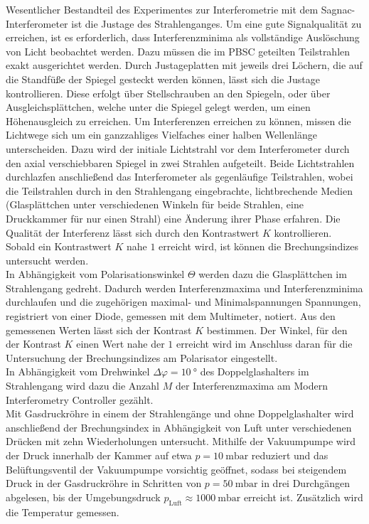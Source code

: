 \label{durchfuehrung}
\noindent Wesentlicher Bestandteil des Experimentes zur Interferometrie mit dem
Sagnac-Interferometer ist die Justage des Strahlenganges. Um eine gute
Signalqualität zu erreichen, ist es erforderlich, dass Interferenzminima als
vollständige Auslöschung von Licht beobachtet werden. Dazu müssen die im PBSC
geteilten Teilstrahlen exakt ausgerichtet werden. Durch Justageplatten mit
jeweils drei Löchern, die auf die Standfüße der Spiegel gesteckt werden können,
lässt sich die Justage kontrollieren. Diese erfolgt über Stellschrauben an den
Spiegeln, oder über Ausgleichsplättchen, welche unter die Spiegel gelegt werden,
um einen Höhenausgleich zu erreichen. Um Interferenzen erreichen zu können,
missen die Lichtwege sich um ein ganzzahliges Vielfaches einer halben Wellenlänge
unterscheiden. Dazu wird der initiale Lichtstrahl vor dem Interferometer durch
den axial verschiebbaren Spiegel in zwei Strahlen aufgeteilt. Beide Lichtstrahlen
durchlazfen anschließend das Interferometer als gegenläufige Teilstrahlen, wobei
die Teilstrahlen durch in den Strahlengang eingebrachte, lichtbrechende Medien
(Glasplättchen unter verschiedenen Winkeln für beide Strahlen, eine Druckkammer
für nur einen Strahl) eine Änderung ihrer Phase erfahren. Die Qualität der
Interferenz lässt sich durch den Kontrastwert $K$ kontrollieren. Sobald ein
Kontrastwert $K$ nahe $1$ erreicht wird, ist können die Brechungsindizes
untersucht werden. \\
\noindent In Abhängigkeit vom Polarisationswinkel $\Theta$ werden dazu die
Glasplättchen im Strahlengang gedreht. Dadurch werden Interferenzmaxima und
Interferenzminima durchlaufen und die zugehörigen maximal- und Minimalspannungen
Spannungen, registriert von einer Diode, gemessen mit dem Multimeter, notiert.
Aus den gemessenen Werten lässt sich der Kontrast $K$ bestimmen. Der Winkel, für
den der Kontrast $K$ einen Wert nahe der $1$ erreicht wird im Anschluss daran für
die Untersuchung der Brechungsindizes am Polarisator eingestellt. \\
\noindent In Abhängigkeit vom Drehwinkel $\Delta \varphi = \SI{10}{\degree}$ des
Doppelglashalters im Strahlengang wird dazu die Anzahl $M$ der Interferenzmaxima
am Modern Interferometry Controller gezählt.  \\
\noindent Mit Gasdruckröhre in einem der Strahlengänge und ohne Doppelglashalter
wird anschließend der Brechungsindex in Abhängigkeit von Luft unter verschiedenen
Drücken mit zehn Wiederholungen untersucht. Mithilfe der Vakuumpumpe wird der Druck innerhalb der
Kammer auf etwa $p = \SI{10}{\milli\bar}$ reduziert und das Belüftungsventil der
Vakuumpumpe vorsichtig geöffnet, sodass bei steigendem Druck in der Gasdruckröhre
in Schritten von $p = \SI{50}{\milli\bar}$ in drei Durchgängen abgelesen, bis
der Umgebungsdruck $p_\text{Luft} \approx \SI{1000}{\milli\bar}$ erreicht ist.
Zusätzlich wird die Temperatur gemessen.
